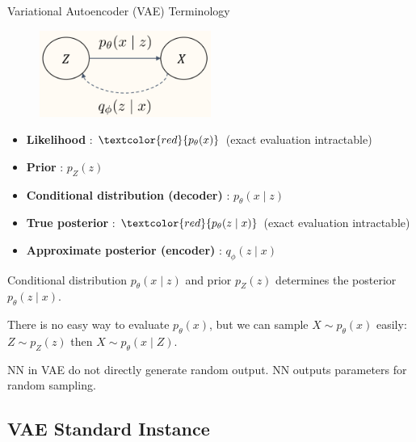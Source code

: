 \begin{frame}[allowframebreaks]

\begin{mydefinitionblock}{11.16}{Variational Autoencoder (VAE) Terminology}
    \begin{figure}[H]
        \centering
        \includegraphics[width=0.5\textwidth]{.././assets/11.4.png}
    \end{figure}

    \begin{itemize}
        \item \textbf{Likelihood} : $\textcolor{red}{p_{\theta}(x)}$ (exact evaluation intractable)
        \item \textbf{Prior} : $p_{Z}(z)$
        \item \textbf{Conditional distribution (decoder)} : $p_{\theta}(x \mid z)$
        \item \textbf{True posterior} : $\textcolor{red}{p_{\theta}(z \mid x)}$ (exact evaluation intractable)
        \item \textbf{Approximate posterior (encoder)} : $q_{\phi}(z \mid x)$
    \end{itemize}

    \par\noindent\textcolor{gray}{\hdashrule{\textwidth}{0.4pt}{1pt 2pt}}

    Conditional distribution $p_{\theta}(x \mid z)$ and prior $p_{Z}(z)$ determines the posterior $p_{\theta}(z \mid x)$.

    There is no easy way to evaluate $p_{\theta}(x)$, but we can sample $X \sim p_{\theta}(x)$ easily: $Z \sim p_{Z}(z)$ then $X \sim p_{\theta}(x \mid Z)$.

    NN in VAE do not directly generate random output. NN outputs parameters for random sampling.
\end{mydefinitionblock}

\end{frame}

\subsection{VAE Standard Instance}

